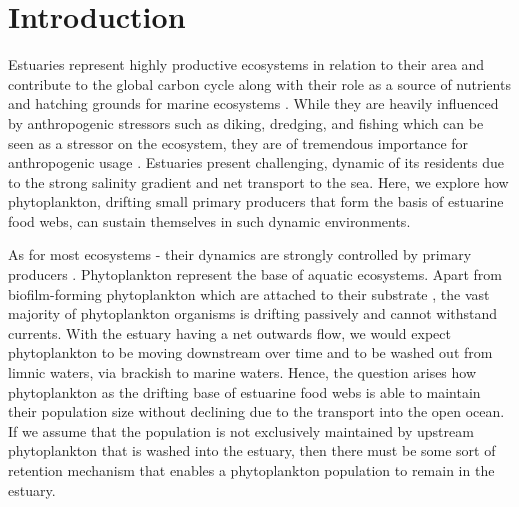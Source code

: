 \documentclass[npg, manuscript]{copernicus}
\begin{document}


\section{Introduction}

Estuaries represent highly productive ecosystems in relation to their area and contribute to the global carbon cycle along with their role as a source of nutrients and hatching grounds for marine ecosystems \citep{Cloern2014,Arevalo2023}.
While they are heavily influenced by anthropogenic stressors such as diking, dredging, and fishing which can be seen as a stressor on the ecosystem, they are of tremendous importance for anthropogenic usage 
\citep{Jennerjahn2013, Brown2022, Wilson2002}.
Estuaries present challenging, dynamic  of its residents due to the strong salinity gradient and net transport to the sea.
Here, we explore how phytoplankton, drifting small primary producers that form the basis of estuarine food webs, can sustain themselves in such dynamic environments.

As for most ecosystems - their dynamics are strongly controlled by primary producers \citep{Chen2023}.
Phytoplankton represent the base of aquatic ecosystems. 
Apart from biofilm-forming phytoplankton which are attached to their substrate \citep{Cheah2022},
the vast majority of phytoplankton organisms is drifting passively and cannot withstand currents.
With the estuary having a net outwards flow, we would expect phytoplankton to be moving downstream over time and to be washed out from limnic waters, via brackish to marine waters.
Hence, the question arises how phytoplankton as the drifting base of estuarine food webs is able to maintain their population size without declining due to the transport into the open ocean.
If we assume that the population is not exclusively maintained by upstream phytoplankton that is washed into the estuary, then there must be some sort of retention mechanism that enables a phytoplankton population to remain in the estuary.
\end{document}
